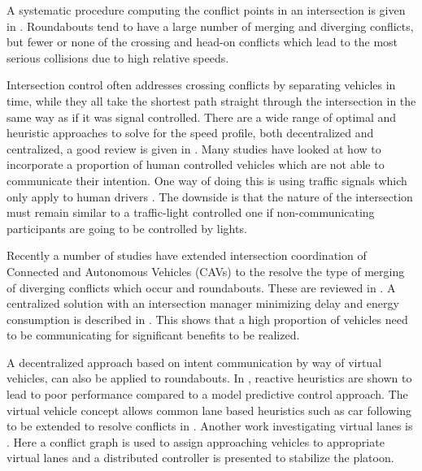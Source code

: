 A systematic procedure computing the conflict points in an intersection is given in \cite{Lu2013}. Roundabouts tend to have a large number of merging and diverging conflicts, but fewer or none of the crossing and head-on conflicts which lead to the most serious collisions due to high relative speeds.

Intersection control often addresses crossing conflicts by separating vehicles in time, while they all take the shortest path straight through the intersection in the same way as if it was signal controlled. There are a wide range of optimal and heuristic approaches to solve for the speed profile, both decentralized and centralized, a good review is given in \cite{Rios-Torres2017}. Many studies have looked at how to incorporate a proportion of human controlled vehicles which are not able to communicate their intention. One way of doing this is using traffic signals which only apply to human drivers \cite{Zhao2019}. The downside is that the nature of the intersection must remain similar to a traffic-light controlled one if non-communicating participants are going to be controlled by lights.

Recently a number of studies have extended intersection coordination of Connected and Autonomous Vehicles (CAVs) to the resolve the type of merging of diverging conflicts which occur and roundabouts. These are reviewed in \cite{Rios-Torres2017}. A centralized solution with an intersection manager minimizing delay and energy consumption is described in \cite{Zhao2018}. This shows that a high proportion of vehicles need to be communicating for significant benefits to be realized. 

A decentralized approach based on intent communication by way of virtual vehicles, can also be applied to roundabouts. In \cite{Debada2016}, reactive heuristics are shown to lead to poor performance compared to a model predictive control approach. The virtual vehicle concept allows common lane based heuristics such as car following to be extended to resolve conflicts in  \cite{Debada2018}. Another work investigating virtual lanes is \cite{Xu2018}. Here a conflict graph is used to assign approaching vehicles to appropriate virtual lanes and a distributed controller is presented to stabilize the platoon.

